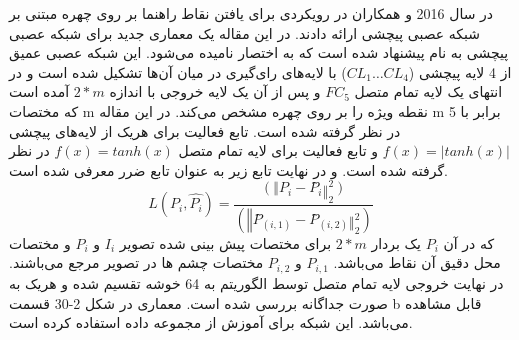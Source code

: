 \noindent
در سال 2016  و همکاران در \cite{wu2016facial} رویکردی برای یافتن نقاط راهنما بر روی چهره مبتنی بر شبکه عصبی پیچشی ارائه دادند. در این مقاله یک معماری جدید برای شبکه عصبی پیچشی به نام
پیشنهاد شده است که به اختصار  نامیده می‌شود. این شبکه عصبی عمیق از 4 لایه پیچشی ($CL_1 \dots CL_4$) با لایه‌های رای‌گیری در میان آن‌ها تشکیل شده است و در انتهای یک لایه تمام متصل  $FC_5$ و پس از آن یک لایه خروجی با اندازه $2*m$ آمده است که مختصات m نقطه ویژه را بر روی چهره مشخص می‌کند. در این مقاله m برابر با 5 در نظر گرفته شده است. تابع فعالیت برای هریک از لایه‌های پیچشی $f(x)=|tanh⁡(x)|$ و تابع فعالیت برای لایه تمام متصل $f(x)=tanh⁡(x)$ در نظر گرفته شده است. و در نهایت تابع زیر به عنوان تابع ضرر معرفی شده است.
\begin{equation}\label{eq2-12}
L(P_i,\hat{P_i})=\frac{(‖P_i-P ̂_i ‖_2^2)}{(‖P ̂_(i,1)-P ̂_(i,2) ‖_2^2 )}	
\end{equation}
\noindent
که در آن $P_i$ یک بردار $2*m$ برای مختصات پیش بینی شده تصویر $I_i$ و $P_i$ و مختصات محل دقیق آن نقاط می‌باشد. $P_{i,1}$ و $P_{i,2}$ مختصات چشم ها در تصویر مرجع می‌باشند. در نهایت خروجی لایه تمام متصل توسط الگوریتم  به 64 خوشه تقسیم شده و هریک به صورت جداگانه بررسی شده است. معماری  در شکل 2-30 قسمت b قابل مشاهده می‌باشد. این شبکه برای آموزش از مجموعه داده  استفاده کرده است.


